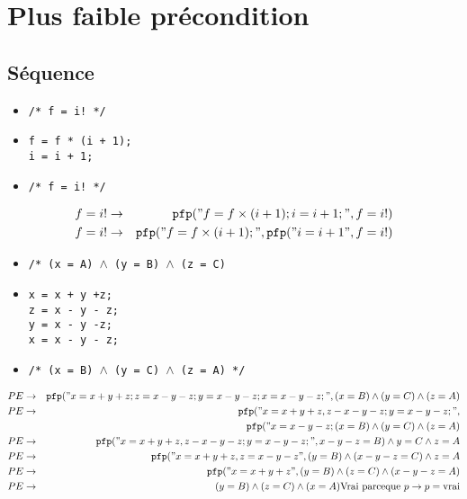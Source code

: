 \section{Plus faible précondition}
\subsection{Séquence}\label{exoPfpSequence}
\begin{itemize}
	\item \texttt{/* f = i! */}
	\item \texttt{f = f * (i + 1);\\i = i + 1;}
	\item \texttt{/* f = i! */}
\end{itemize}
\begin{eqnarray*}
	f = i! &\rightarrow& \texttt{pfp}("f = f\times (i+1); i = i +1;", f= i!)\\
	f=i!&\rightarrow&\texttt{pfp}("f=f\times(i+1);",\texttt{pfp}("i=i+1",f=i!)\\
\end{eqnarray*}
\begin{itemize}
	\item \texttt{/* (x = A) $\wedge$ (y = B) $\wedge$ (z = C)}
	\item \texttt{x = x + y +z;\\z = x - y - z;\\y = x - y -z;\\x = x - y - z;}
	\item \texttt{/* (x = B) $\wedge$ (y = C) $\wedge$ (z = A) */}
\end{itemize}
\begin{eqnarray*}
	PE &\rightarrow& \texttt{pfp}("x=x+y+z;z=x-y-z;y=x-y-z;x=x-y-z;", (x=B)\wedge(y=C)\wedge(z=A)\\
	PE &\rightarrow& \texttt{pfp}("x=x+y+z, z-x-y-z;y=x-y-z;", \\&&\texttt{pfp}("x=x-y-z;(x=B)\wedge(y=C)\wedge(z=A)\\
	PE &\rightarrow& \texttt{pfp}("x=x+y+z, z-x-y-z;y=x-y-z;", x-y-z=B)\wedge y=C \wedge z = A\\
	PE &\rightarrow& \texttt{pfp}("x=x+y+z,z=x-y-z", (y=B)\wedge (x-y-z=C)\wedge z = A\\
	PE &\rightarrow& \texttt{pfp}("x=x+y+z", (y=B)\wedge (z=C) \wedge (x-y-z=A)\\
	PE &\rightarrow& (y=B) \wedge (z=C)\wedge(x=A) \textmd{Vrai parceque }p\rightarrow p = \textmd{vrai}
\end{eqnarray*}

